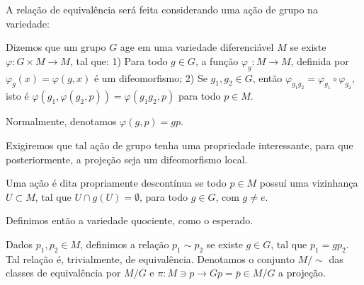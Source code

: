 A relação de equivalência será feita considerando uma ação de grupo na variedade:
\begin{definition}
    \label{loc:4.8_:_def_7_:_ação_de_grupo_em_variedade_e_variedade_quociente.ação_de_grupo}
    Dizemos que um grupo $G$ age em uma variedade diferenciável $M$ se existe $\varphi:G\times M\to M$, tal que:
    1) Para todo $g \in G$, a função $\varphi_{g}:M\to M$, definida por $\varphi_{g}(x)=\varphi(g, x)$ é um difeomorfismo;
    2) Se $g_{1}, g_{2} \in G$, então $\varphi_{g_{1}g_{2}}=\varphi_{g_{1}}\circ\varphi_{g_{2}}$, isto é $\varphi(g_{1}, \varphi(g_{2}, p))=\varphi (g_{1}g_{2}, p)$ para todo $p \in M$.

    Normalmente, denotamos $\varphi(g,p)=gp$.
\end{definition}
Exigiremos que tal ação de grupo tenha uma propriedade interessante, para que posteriormente, a projeção seja um difeomorfismo local.
\begin{definition}
    \label{loc:4.8_:_def_7_:_ação_de_grupo_em_variedade_e_variedade_quociente.ação_de_grupo_propriamente_descontínua}
    Uma ação é dita propriamente descontínua se todo $p \in M$ possuí uma vizinhança $U \subset M$, tal que $U \cap g(U)=\emptyset$, para todo $g \in G$, com $g\neq e$.
\end{definition}
Definimos então a variedade quociente, como o esperado.
\begin{definition}
    \label{loc:4.8_:_def_7_:_ação_de_grupo_em_variedade_e_variedade_quociente.variedade_quociente}
    Dados $p_{1}, p_{2} \in M$, definimos a relação $p_{1} \sim  p_{2}$ se existe $g \in G$, tal que $p_{1}=gp_{2}$. Tal relação é, trivialmente, de equivalência. Denotamos o conjunto $M/\sim$ das classes de equivalência por $M/G$ e $\pi:M \ni p\to Gp=\bar{p} \in M/G$ a projeção.
\end{definition}
